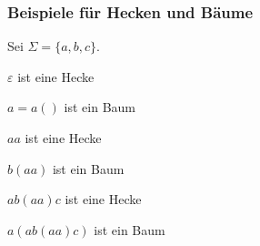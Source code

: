     \begin{frame}
      \frametitle{Beispiele für Hecken und Bäume}

      Sei $\Sigma = \{a,b,c\}$.
      
      \par\bigskip
      $\varepsilon$ ist eine Hecke
      \par\smallskip
      \Bmph{$\leadsto$} $a = a()$ ist ein Baum
      \par\smallskip
      \Bmph{$\leadsto$} $aa$ ist eine Hecke
      \par\smallskip
      \Bmph{$\leadsto$} $b(aa)$ ist ein Baum
      \par\smallskip
      \Bmph{$\leadsto$} $ab(aa)c$ ist eine Hecke
      \par\smallskip
      \Bmph{$\leadsto$} $a(ab(aa)c)$ ist ein Baum
      \Tafel
      
      \par\bigskip

    \end{frame}

